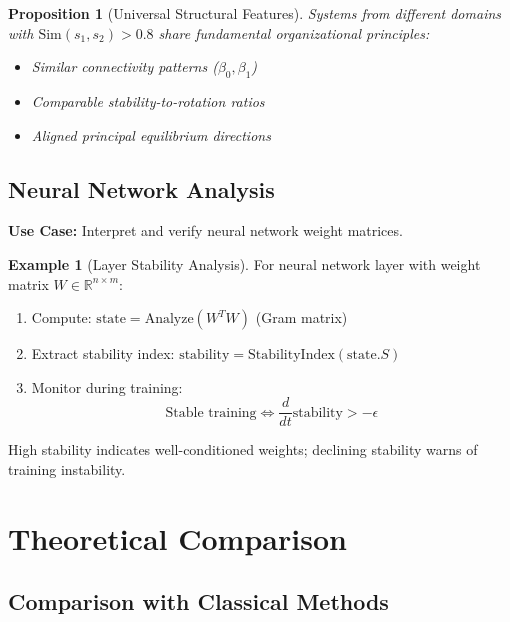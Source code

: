 \documentclass[11pt,a4paper]{article}
\newtheorem{proposition}[theorem]{Proposition}
\theoremstyle{definition}
\newtheorem{example}[theorem]{Example}
\theoremstyle{remark}
\newcommand{\R}{\mathbb{R}}
\begin{document}
\begin{proposition}[Universal Structural Features]
Systems from different domains with $\text{Sim}(s_1, s_2) > 0.8$ share fundamental organizational principles:
\begin{itemize}
\item Similar connectivity patterns ($\beta_0, \beta_1$)
\item Comparable stability-to-rotation ratios
\item Aligned principal equilibrium directions
\end{itemize}
\end{proposition}

\subsection{Neural Network Analysis}

\textbf{Use Case:} Interpret and verify neural network weight matrices.

\begin{example}[Layer Stability Analysis]
For neural network layer with weight matrix $W \in \R^{n \times m}$:

\begin{enumerate}
\item Compute: $\text{state} = \text{Analyze}(W^T W)$ (Gram matrix)
\item Extract stability index: $\text{stability} = \text{StabilityIndex}(\text{state}.S)$
\item Monitor during training:
\begin{equation}
\text{Stable training} \iff \frac{d}{dt}\text{stability} > -\epsilon
\end{equation}
\end{enumerate}

High stability indicates well-conditioned weights; declining stability warns of training instability.
\end{example}

\section{Theoretical Comparison}

\subsection{Comparison with Classical Methods}
\end{document}
